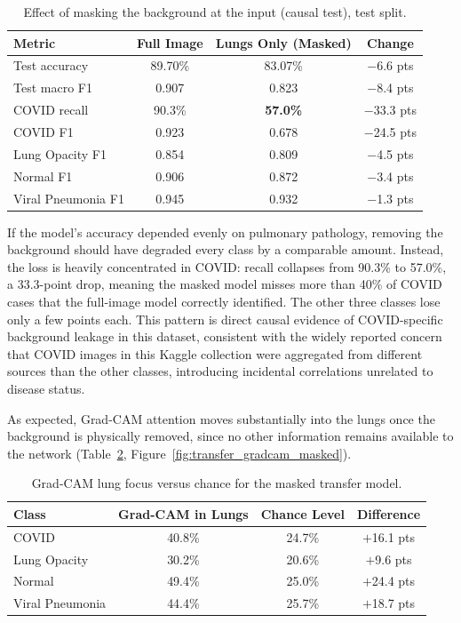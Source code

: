 \begin{table}[H]
\centering
\caption{Effect of masking the background at the input (causal test), test split.}
\label{tab:transfer_masked_causal}
\begin{tabular}{lccc}
\toprule
\textbf{Metric} & \textbf{Full Image} & \textbf{Lungs Only (Masked)} & \textbf{Change} \\
\midrule
Test accuracy      & 89.70\% & 83.07\% & $-$6.6 pts \\
Test macro F1       & 0.907   & 0.823   & $-$8.4 pts \\
COVID recall        & 90.3\%  & \textbf{57.0\%} & $-$33.3 pts \\
COVID F1            & 0.923   & 0.678   & $-$24.5 pts \\
Lung Opacity F1     & 0.854   & 0.809   & $-$4.5 pts \\
Normal F1           & 0.906   & 0.872   & $-$3.4 pts \\
Viral Pneumonia F1  & 0.945   & 0.932   & $-$1.3 pts \\
\bottomrule
\end{tabular}
\end{table}

If the model's accuracy depended evenly on pulmonary pathology, removing the
background should have degraded every class by a comparable amount.
Instead, the loss is heavily concentrated in COVID: recall collapses from
90.3\% to 57.0\%, a 33.3-point drop, meaning the masked model misses more
than 40\% of COVID cases that the full-image model correctly identified. The
other three classes lose only a few points each. This pattern is direct
causal evidence of COVID-specific background leakage in this dataset,
consistent with the widely reported concern that COVID images in this
Kaggle collection were aggregated from different sources than the other
classes, introducing incidental correlations unrelated to disease status.

As expected, Grad-CAM attention moves substantially into the lungs once the
background is physically removed, since no other information remains
available to the network (Table~\ref{tab:transfer_lung_focus_masked},
Figure~\ref{fig:transfer_gradcam_masked}).

\begin{table}[H]
\centering
\caption{Grad-CAM lung focus versus chance for the masked transfer model.}
\label{tab:transfer_lung_focus_masked}
\begin{tabular}{lccc}
\toprule
\textbf{Class} & \textbf{Grad-CAM in Lungs} & \textbf{Chance Level} & \textbf{Difference} \\
\midrule
COVID            & 40.8\% & 24.7\% & $+$16.1 pts \\
Lung Opacity     & 30.2\% & 20.6\% & $+$9.6 pts \\
Normal           & 49.4\% & 25.0\% & $+$24.4 pts \\
Viral Pneumonia  & 44.4\% & 25.7\% & $+$18.7 pts \\
\bottomrule
\end{tabular}
\end{table}

